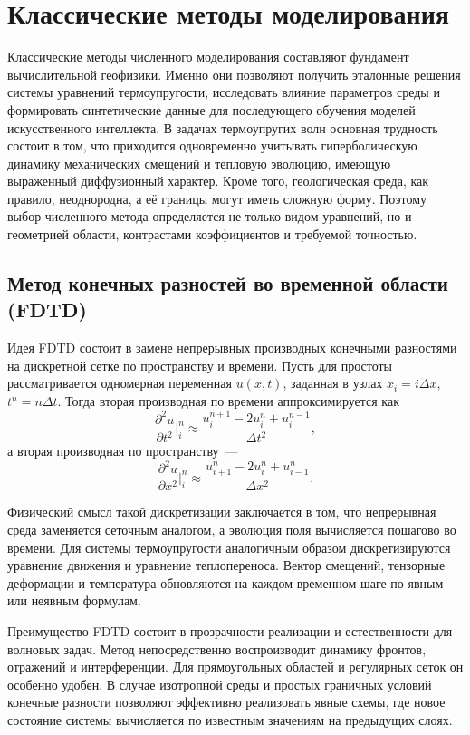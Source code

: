 \section{Классические методы моделирования}

Классические методы численного моделирования составляют фундамент вычислительной геофизики. Именно они позволяют получить эталонные решения системы уравнений термоупругости, исследовать влияние параметров среды и формировать синтетические данные для последующего обучения моделей искусственного интеллекта. В задачах термоупругих волн основная трудность состоит в том, что приходится одновременно учитывать гиперболическую динамику механических смещений и тепловую эволюцию, имеющую выраженный диффузионный характер. Кроме того, геологическая среда, как правило, неоднородна, а её границы могут иметь сложную форму. Поэтому выбор численного метода определяется не только видом уравнений, но и геометрией области, контрастами коэффициентов и требуемой точностью.

\subsection*{Метод конечных разностей во временной области (FDTD)}

Идея FDTD состоит в замене непрерывных производных конечными разностями на дискретной сетке по пространству и времени. Пусть для простоты рассматривается одномерная переменная $u(x,t)$, заданная в узлах $x_i=i\Delta x$, $t^n=n\Delta t$. Тогда вторая производная по времени аппроксимируется как
\begin{equation}
\frac{\partial^2 u}{\partial t^2}\Big|_{i}^{n}
\approx
\frac{u_i^{n+1}-2u_i^n+u_i^{n-1}}{\Delta t^2},
\end{equation}
а вторая производная по пространству~---
\begin{equation}
\frac{\partial^2 u}{\partial x^2}\Big|_{i}^{n}
\approx
\frac{u_{i+1}^n-2u_i^n+u_{i-1}^n}{\Delta x^2}.
\end{equation}

Физический смысл такой дискретизации заключается в том, что непрерывная среда заменяется сеточным аналогом, а эволюция поля вычисляется пошагово во времени. Для системы термоупругости аналогичным образом дискретизируются уравнение движения и уравнение теплопереноса. Вектор смещений, тензорные деформации и температура обновляются на каждом временном шаге по явным или неявным формулам.

Преимущество FDTD состоит в прозрачности реализации и естественности для волновых задач. Метод непосредственно воспроизводит динамику фронтов, отражений и интерференции. Для прямоугольных областей и регулярных сеток он особенно удобен. В случае изотропной среды и простых граничных условий конечные разности позволяют эффективно реализовать явные схемы, где новое состояние системы вычисляется по известным значениям на предыдущих слоях.


